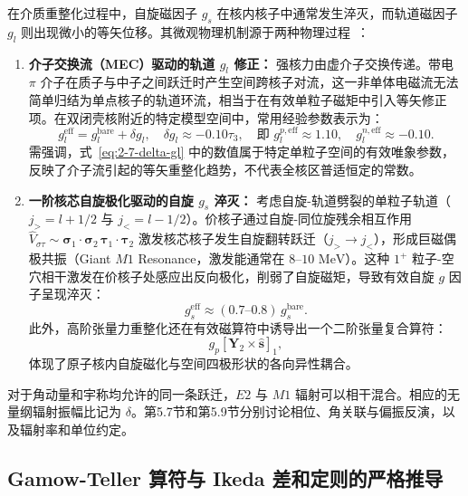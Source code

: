 在介质重整化过程中，自旋磁因子 $g_s$ 在核内核子中通常发生淬灭，而轨道磁因子 $g_l$ 则出现微小的等矢位移。其微观物理机制源于两种物理过程~\cite{book-suhonen-from-nucleons-to-nucleus,book-bohr-mottelson-nuclear-structure}：
\begin{enumerate}
\item \textbf{介子交换流（MEC）驱动的轨道 $g_l$ 修正：} 强核力由虚介子交换传递。带电 $\pi$ 介子在质子与中子之间跃迁时产生空间跨核子对流，这一非单体电磁流无法简单归结为单点核子的轨道环流，相当于在有效单粒子磁矩中引入等矢修正项。在双闭壳核附近的特定模型空间中，常用经验参数表示为：
\begin{equation}\label{eq:2-7-delta-gl}
g_l^{\mathrm{eff}} = g_l^{\mathrm{bare}} + \delta g_l, \quad \delta g_l \approx -0.10 \tau_3, \quad \text{即 } g_l^{p,\mathrm{eff}} \approx 1.10, \quad g_l^{n,\mathrm{eff}} \approx -0.10.
\end{equation}
需强调，式~\eqref{eq:2-7-delta-gl} 中的数值属于特定单粒子空间的有效唯象参数，反映了介子流引起的等矢重整化趋势，不代表全核区普适恒定的常数。
\item \textbf{一阶核芯自旋极化驱动的自旋 $g_s$ 淬灭：} 考虑自旋-轨道劈裂的单粒子轨道（$j_> = l + 1/2$ 与 $j_< = l - 1/2$）。价核子通过自旋-同位旋残余相互作用 $\hat{V}_{\sigma\tau} \sim \boldsymbol{\sigma}_1 \cdot \boldsymbol{\sigma}_2 \, \boldsymbol{\tau}_1 \cdot \boldsymbol{\tau}_2$ 激发核芯核子发生自旋翻转跃迁（$j_> \to j_<$），形成巨磁偶极共振（Giant $M1$ Resonance，激发能通常在 $8\text{--}10\text{ MeV}$）。这种 $1^+$ 粒子-空穴相干激发在价核子处感应出反向极化，削弱了自旋磁矩，导致有效自旋 $g$ 因子呈现淬灭：
\begin{equation}\label{eq:2-7-gs-quench}
g_s^{\mathrm{eff}} \approx (0.7\text{--}0.8) \, g_s^{\mathrm{bare}}.
\end{equation}
此外，高阶张量力重整化还在有效磁算符中诱导出一个二阶张量复合算符：
\begin{equation*}
g_p [\mathbf{Y}_2 \times \hat{\mathbf{s}}]_1 ,
\end{equation*}
体现了原子核内自旋磁化与空间四极形状的各向异性耦合。
\end{enumerate}

对于角动量和宇称均允许的同一条跃迁，$E2$ 与 $M1$ 辐射可以相干混合。相应的无量纲辐射振幅比记为 $\delta$。第5.7节和第5.9节分别讨论相位、角关联与偏振反演，以及辐射率和单位约定。

\subsection{Gamow-Teller 算符与 Ikeda 差和定则的严格推导}\label{sec:2-7-4}

